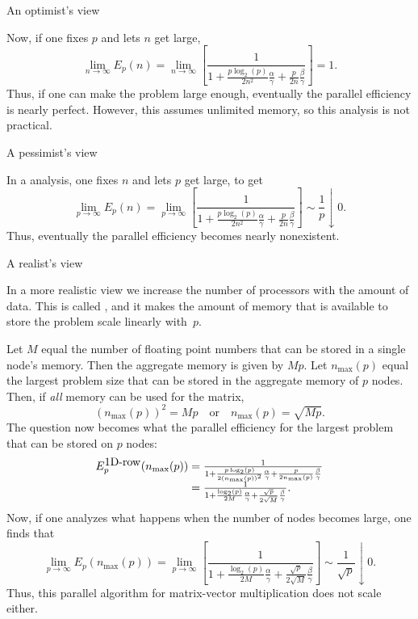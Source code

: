  {An optimist's view}

Now, if one fixes $ p $ and lets $ n $ get large,
\[
\lim_{n \rightarrow \infty} E_p( n ) =
\lim_{n \rightarrow \infty}
\left[
\frac{1}
{ 1 + \frac{p \log_2(p)}{2 n^2} \frac{\alpha}{\gamma} 
+ \frac{p}{2 n} \frac{\beta}{\gamma} }
\right]
=
1.
\]
Thus, if one can make the problem large enough, eventually the parallel
efficiency is nearly perfect. However, this assumes unlimited memory,
so this analysis is not practical.

 {A pessimist's view}

In a  analysis,
one fixes $ n $ and lets $ p $ get large, to get
\[
\lim_{p \rightarrow \infty} E_p( n ) =
\lim_{p \rightarrow \infty}
\left[
\frac{1}
{1 + \frac{p \log_2(p)}{2 n^2} \frac{\alpha}{\gamma} 
+ \frac{p}{2 n} \frac{\beta}{\gamma} }
\right]
\sim \frac{1}{p}\downarrow
0.
\]
Thus, eventually the parallel efficiency becomes nearly nonexistent.

 {A realist's view}

In a more realistic view we increase the number of processors with the
amount of data. This is called , and 
it makes the amount of memory that is available to
store the problem scale linearly with~$ p $.  

Let $ M $ equal the
number of floating point numbers that can be stored in a single node's
memory.  Then the aggregate memory is given by $ M p $.  Let $
n_{\max}(p) $ equal the largest problem size that can be stored
in the aggregate memory of $ p $ nodes.  Then, if {\em all} memory can
be used for the matrix,
\[
(n_{\max}(p))^2 = M p
\quad
\mbox{or}
\quad
n_{\max}(p) = \sqrt{Mp}.
\]
The question now becomes what the parallel 
efficiency for the largest problem that can be stored on $ p $ nodes:
\[ 
\begin{array}{r@{{}={}}l}
E_p^{\mbox{1D-row}}(n_{\max}(p)) &
\frac{1}
{1 + \frac{p \log_2(p)}{2 (n_{\max}(p))^2} \frac{\alpha}{\gamma} 
+ \frac{p}{2 n_{\max}(p)} \frac{\beta}{\gamma} }
\\
&
\frac{1}
{ 1 + \frac{\log_2(p)}{2 M} \frac{\alpha}{\gamma} 
+ \frac{\sqrt{p}}{2 \sqrt{M}} \frac{\beta}{\gamma} }.
\end{array}
\]
Now, if one analyzes what happens when the number of nodes
becomes large, one finds that
\[
\lim_{p \rightarrow \infty} E_p( n_{\max}(p) ) 
=
\lim_{p \rightarrow \infty}
\left[
\frac{1}
{1 + \frac{\log_2(p)}{2 M} \frac{\alpha}{\gamma} 
+ \frac{\sqrt{p}}{2 \sqrt{M}} \frac{\beta}{\gamma} }
\right]
\sim \frac{1}{\sqrt p} \downarrow
0.
\]
Thus, this parallel algorithm for matrix-vector multiplication does
not scale either.

